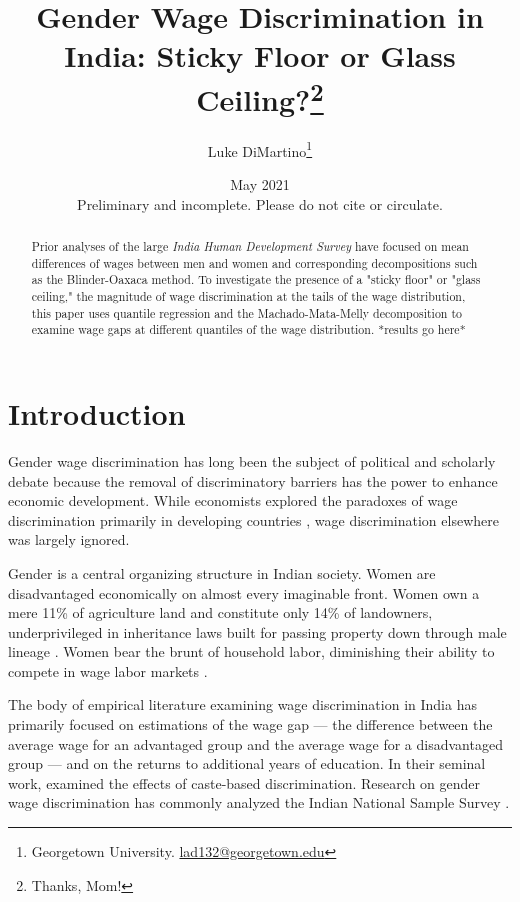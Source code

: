 \documentclass[12pt]{article}
\title{
Gender Wage Discrimination in India: Sticky Floor or Glass Ceiling?\thanks{Thanks, Mom!}}
\author{Luke DiMartino\thanks{Georgetown University. \href{mailto:lad132@georgetown.edu}{lad132@georgetown.edu}}}
\date{May 2021 \\
\vspace*{.3cm}Preliminary and incomplete. Please do not cite or circulate.}
\begin{document}
\bgroup

\let\footnoterule\relax

\begin{singlespace}
\maketitle

\begin{abstract}
Prior analyses of the large \textit{India Human Development Survey} have focused on mean differences of wages between men and women and corresponding decompositions such as the Blinder-Oaxaca method. To investigate the presence of a "sticky floor" or "glass ceiling," the magnitude of wage discrimination at the tails of the wage distribution, this paper uses quantile regression and the Machado-Mata-Melly decomposition to examine wage gaps at different quantiles of the wage distribution. *results go here* 
\end{abstract}
\end{singlespace}
\thispagestyle{empty}

\clearpage
\egroup
\setcounter{page}{1}

\section{Introduction
\label{sec:introduction}}

Gender wage discrimination has long been the subject of political and scholarly debate because the removal of discriminatory barriers has the power to enhance economic development. While economists explored the paradoxes of wage discrimination primarily in developing countries \citep{BlauKahn}, wage discrimination elsewhere was largely ignored. 

Gender is a central organizing structure in Indian society. Women are disadvantaged economically on almost every imaginable front. Women own a mere 11\% of agriculture land and constitute only 14\% of landowners, underprivileged in inheritance laws built for passing property down through male lineage \citep{AgarwalAnthwalMahesh}. Women bear the brunt of household labor, diminishing their ability to compete in wage labor markets \citep{Debnath}.

The body of empirical literature examining wage discrimination in India has primarily focused on estimations of the wage gap --- the difference between the average wage for an advantaged group and the average wage for a disadvantaged group --- and on the returns to additional years of education. In their seminal work, \citet{BanerjeeandKnight1985} examined the effects of caste-based discrimination. Research on gender wage discrimination has commonly analyzed the Indian National Sample Survey \citep{BhaumikChakrabarty}.
\end{document}

